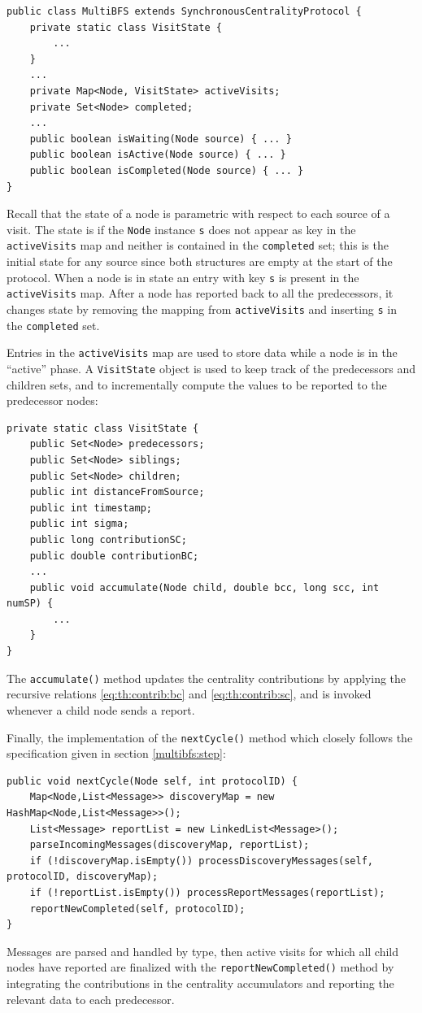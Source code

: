 \begin{verbatim}
public class MultiBFS extends SynchronousCentralityProtocol {
    private static class VisitState {
        ...
    }
    ...
    private Map<Node, VisitState> activeVisits;
    private Set<Node> completed;
    ...
    public boolean isWaiting(Node source) { ... }
    public boolean isActive(Node source) { ... }
    public boolean isCompleted(Node source) { ... }
}
\end{verbatim}
Recall that the state of a node is parametric with respect to each source of a visit. The state is  if the \texttt{Node} instance \texttt{s} does not appear as key in the \texttt{activeVisits} map and neither is contained in the \texttt{completed} set; this is the initial state for any source since both structures are empty at the start of the protocol. When a node is in state  an entry with key \texttt{s} is present in the \texttt{activeVisits} map. After a node has reported back to all the predecessors, it changes state  by removing the mapping from \texttt{activeVisits} and inserting \texttt{s} in the \texttt{completed} set.

Entries in the \texttt{activeVisits} map are used to store data while a node is in the ``active'' phase. A \texttt{VisitState} object is used to keep track of the predecessors and children sets, and to incrementally compute the values to be reported to the predecessor nodes:
\begin{verbatim}
private static class VisitState {
    public Set<Node> predecessors;
    public Set<Node> siblings;
    public Set<Node> children;
    public int distanceFromSource;
    public int timestamp;
    public int sigma;
    public long contributionSC;
    public double contributionBC;
    ...	
    public void accumulate(Node child, double bcc, long scc, int numSP) {
        ...
    }
}
\end{verbatim}
The \texttt{accumulate()} method updates the centrality contributions by applying the recursive relations \eqref{eq:th:contrib:bc} and \eqref{eq:th:contrib:sc}, and is invoked whenever a child node sends a report.

Finally, the implementation of the \texttt{nextCycle()} method which closely follows the specification given in section \ref{multibfs:step}:
\begin{verbatim}
public void nextCycle(Node self, int protocolID) {
    Map<Node,List<Message>> discoveryMap = new HashMap<Node,List<Message>>();
    List<Message> reportList = new LinkedList<Message>();
    parseIncomingMessages(discoveryMap, reportList);
    if (!discoveryMap.isEmpty()) processDiscoveryMessages(self, protocolID, discoveryMap);
    if (!reportList.isEmpty()) processReportMessages(reportList);
    reportNewCompleted(self, protocolID);
}
\end{verbatim}
Messages are parsed and handled by type, then active visits for which all child nodes have reported are finalized with the \texttt{reportNewCompleted()} method by integrating the contributions in the centrality accumulators and reporting the relevant data to each predecessor.